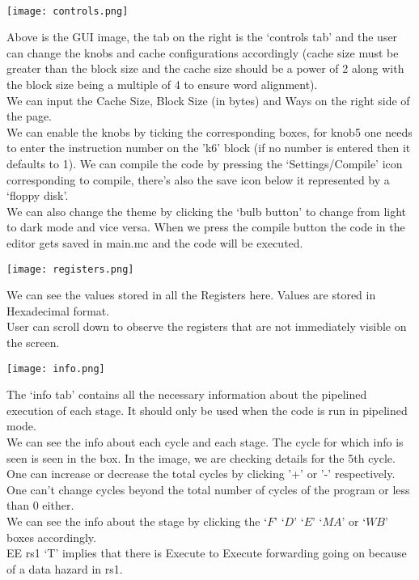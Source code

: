 \documentclass{article}
\begin{document}
\noindent
\newpage

\begin{Huge}
\\
\end{Huge}
\vspace{2cm}
\begin{centering}
\texttt{[image: controls.png]}\vspace{2cm}
\end{centering}
Above is the GUI image, the tab on the right is the `controls tab' and the user can change the knobs and cache configurations accordingly (cache size must be greater than the block size and the cache size should be a power of 2  along with the block size being a multiple of 4 to ensure word alignment).\\
\unindent
We can input the Cache Size, Block Size (in bytes) and Ways on the right side of the page.\\
We can enable the knobs by ticking the corresponding boxes, for knob5 one needs to enter the instruction number on the 'k6' block (if no number is entered then it defaults to 1).
We can compile the code by pressing the `Settings/Compile' icon corresponding to compile, there's also the save icon below it represented by a `floppy disk'.\\
We can also change the theme by clicking the `bulb button' to change from light to dark mode and vice versa.
\unindent
When we press the compile button the code in the editor gets saved in main.mc and the code will be executed.
\newpage
\begin{centering}
\texttt{[image: registers.png]}\vspace{2cm}
\end{centering}
We can see the values stored in all the Registers here. Values are stored in Hexadecimal format.\\
User can scroll down to observe the registers that are not immediately visible on the screen.


\newpage
\begin{centering}
\texttt{[image: info.png]}\vspace{2cm}
\end{centering}
The `info tab' contains all the necessary information about the pipelined execution of each stage. It should only be used when the code is run in pipelined mode.\\
We can see the info about each cycle and each stage.
The cycle for which info is seen is seen in the box. In the image, we are checking details for the 5th cycle.\\
One can increase or decrease the total cycles by clicking '+' or '-' respectively. One can't change cycles beyond the total number of cycles of the program or less than 0 either.\\
We can see the info about the stage by clicking the `$F$' `$D$' `$E$' `$MA$' or `$WB$' boxes accordingly.\\
EE rs1 `T' implies that there is Execute to Execute forwarding going on because of a data hazard in rs1.
\end{document}
